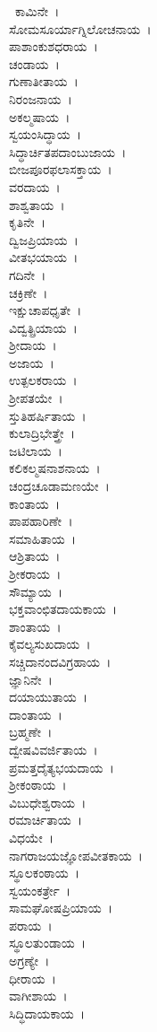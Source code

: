 \ ಕಾಮಿನೇ~।\\ ಸೋಮಸೂರ್ಯಾಗ್ನಿಲೋಚನಾಯ~।\\ ಪಾಶಾಂಕುಶಧರಾಯ~।\\ ಚಂಡಾಯ~।\\ ಗುಣಾತೀತಾಯ~।\\ ನಿರಂಜನಾಯ~।\\ ಅಕಲ್ಮಷಾಯ~।\\ ಸ್ವಯಂಸಿದ್ಧಾಯ~।\\ ಸಿದ್ಧಾರ್ಚಿತಪದಾಂಬುಜಾಯ~।\\ ಬೀಜಪೂರಫಲಾಸಕ್ತಾಯ~।\\ ವರದಾಯ~।\\ ಶಾಶ್ವತಾಯ~।\\ ಕೃತಿನೇ~।\\ ದ್ವಿಜಪ್ರಿಯಾಯ~।\\ ವೀತಭಯಾಯ~।\\ ಗದಿನೇ~।\\ ಚಕ್ರಿಣೇ~।\\ ಇಕ್ಷುಚಾಪಧೃತೇ~।\\ ವಿದ್ವತ್ಪ್ರಿಯಾಯ~।\\ ಶ್ರೀದಾಯ~।\\ ಅಜಾಯ~।\\ ಉತ್ಪಲಕರಾಯ~।\\ ಶ್ರೀಪತಯೇ~।\\ ಸ್ತುತಿಹರ್ಷಿತಾಯ~।\\ ಕುಲಾದ್ರಿಭೇತ್ತ್ರೇ~।\\ ಜಟಿಲಾಯ~।\\ ಕಲಿಕಲ್ಮಷನಾಶನಾಯ~।\\ ಚಂದ್ರಚೂಡಾಮಣಯೇ~।\\ ಕಾಂತಾಯ~।\\ ಪಾಪಹಾರಿಣೇ~।\\ ಸಮಾಹಿತಾಯ~।\\ ಆಶ್ರಿತಾಯ~।\\ ಶ್ರೀಕರಾಯ~।\\ ಸೌಮ್ಯಾಯ~।\\ ಭಕ್ತವಾಂಛಿತದಾಯಕಾಯ~।\\ ಶಾಂತಾಯ~।\\ ಕೈವಲ್ಯಸುಖದಾಯ~।\\ ಸಚ್ಚಿದಾನಂದವಿಗ್ರಹಾಯ~।\\ ಜ್ಞಾನಿನೇ~।\\ ದಯಾಯುತಾಯ~।\\ ದಾಂತಾಯ~।\\ ಬ್ರಹ್ಮಣೇ~।\\ ದ್ವೇಷವಿವರ್ಜಿತಾಯ~।\\ ಪ್ರಮತ್ತದೈತ್ಯಭಯದಾಯ~।\\ ಶ್ರೀಕಂಠಾಯ~।\\ ವಿಬುಧೇಶ್ವರಾಯ~।\\ ರಮಾರ್ಚಿತಾಯ~।\\ ವಿಧಯೇ~।\\ ನಾಗರಾಜಯಜ್ಞೋಪವೀತಕಾಯ~।\\ ಸ್ಥೂಲಕಂಠಾಯ~।\\ ಸ್ವಯಂಕರ್ತ್ರೇ~।\\ ಸಾಮಘೋಷಪ್ರಿಯಾಯ~।\\ ಪರಾಯ~।\\ ಸ್ಥೂಲತುಂಡಾಯ~।\\ ಅಗ್ರಣ್ಯೇ~।\\ ಧೀರಾಯ~।\\ ವಾಗೀಶಾಯ~।\\ ಸಿದ್ಧಿದಾಯಕಾಯ~।\\ 